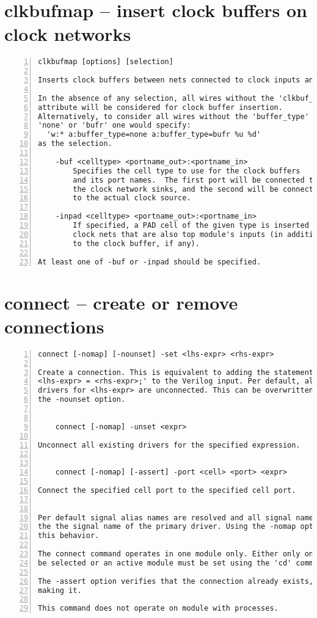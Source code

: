 \section{clkbufmap -- insert clock buffers on clock networks}
\label{cmd:clkbufmap}
\begin{lstlisting}[numbers=left,frame=single]
    clkbufmap [options] [selection]

Inserts clock buffers between nets connected to clock inputs and their drivers.

In the absence of any selection, all wires without the 'clkbuf_inhibit'
attribute will be considered for clock buffer insertion.
Alternatively, to consider all wires without the 'buffer_type' attribute set to
'none' or 'bufr' one would specify:
  'w:* a:buffer_type=none a:buffer_type=bufr %u %d'
as the selection.

    -buf <celltype> <portname_out>:<portname_in>
        Specifies the cell type to use for the clock buffers
        and its port names.  The first port will be connected to
        the clock network sinks, and the second will be connected
        to the actual clock source.

    -inpad <celltype> <portname_out>:<portname_in>
        If specified, a PAD cell of the given type is inserted on
        clock nets that are also top module's inputs (in addition
        to the clock buffer, if any).

At least one of -buf or -inpad should be specified.
\end{lstlisting}

\section{connect -- create or remove connections}
\label{cmd:connect}
\begin{lstlisting}[numbers=left,frame=single]
    connect [-nomap] [-nounset] -set <lhs-expr> <rhs-expr>

Create a connection. This is equivalent to adding the statement 'assign
<lhs-expr> = <rhs-expr>;' to the Verilog input. Per default, all existing
drivers for <lhs-expr> are unconnected. This can be overwritten by using
the -nounset option.


    connect [-nomap] -unset <expr>

Unconnect all existing drivers for the specified expression.


    connect [-nomap] [-assert] -port <cell> <port> <expr>

Connect the specified cell port to the specified cell port.


Per default signal alias names are resolved and all signal names are mapped
the the signal name of the primary driver. Using the -nomap option deactivates
this behavior.

The connect command operates in one module only. Either only one module must
be selected or an active module must be set using the 'cd' command.

The -assert option verifies that the connection already exists, instead of
making it.

This command does not operate on module with processes.
\end{lstlisting}

